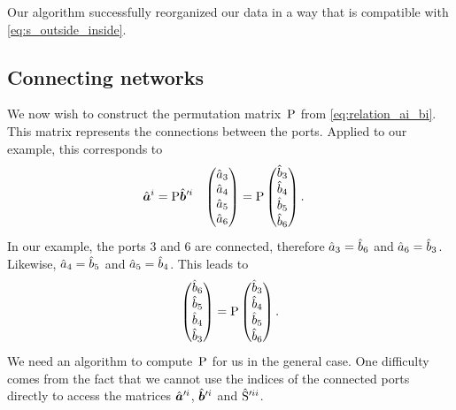 Our algorithm successfully reorganized our data in a way that is compatible with \cref{eq:s_outside_inside}.



\subsection{Connecting networks}

We now wish to construct the permutation matrix~$\mathrm{P}$ from \cref{eq:relation_ai_bi}.
This matrix represents the connections between the ports.
Applied to our example, this corresponds to
\begin{align}
    \hat{\bm{a}}^i
    &=
    \mathrm{P} \hat{\bm{b}}'^i
    &
    \begin{pmatrix}
        \hat{a}_3 \\ \hat{a}_4 \\ \hat{a}_5 \\ \hat{a}_6
    \end{pmatrix}
    &=
    \mathrm{P}
    \begin{pmatrix}
        \hat{b}_3 \\ \hat{b}_4 \\ \hat{b}_5 \\ \hat{b}_6
    \end{pmatrix}
    \text{.}
    \label{eq:relation_ai_bi_example}
\end{align}
In our example, the ports 3 and 6 are connected,
therefore $\hat{a}_3 = \hat{b}_6$ and $\hat{a}_6 = \hat{b}_3$.
Likewise, $\hat{a}_4=\hat{b}_5$ and $\hat{a}_5=\hat{b}_4$.
This leads to
\begin{equation}
    \begin{pmatrix}
        \hat{b}_6 \\ \hat{b}_5 \\ \hat{b}_4 \\ \hat{b}_3
    \end{pmatrix}
    =
    \mathrm{P}
    \begin{pmatrix}
        \hat{b}_3 \\ \hat{b}_4 \\ \hat{b}_5 \\ \hat{b}_6
    \end{pmatrix}
    \text{.}
    \label{eq:relation_bi_bi_example}
\end{equation}
We need an algorithm to compute~$\mathrm{P}$ for us in the general case.
One difficulty comes from the fact that we cannot use the indices of the connected ports directly to access the matrices $\hat{\bm{a}}'^i$, $\hat{\bm{b}}'^i$ and $\hat{\mathrm{S}}'^{ii}$.
